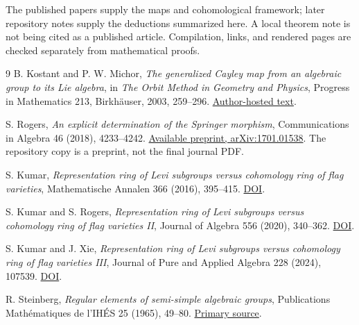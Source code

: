 \documentclass[11pt]{article}
\begin{document}
The published papers supply the maps and cohomological framework; later repository notes supply the deductions summarized here. A local theorem note is not being cited as a published article. Compilation, links, and rendered pages are checked separately from mathematical proofs.

\clearpage
\begin{thebibliography}{9}
B. Kostant and P. W. Michor,
\emph{The generalized Cayley map from an algebraic group to its Lie algebra},
in \emph{The Orbit Method in Geometry and Physics}, Progress in Mathematics 213,
Birkh\"auser, 2003, 259--296.
\href{https://www.mat.univie.ac.at/~michor/kostant.pdf}{Author-hosted text}.

S. Rogers, \emph{An explicit determination of the Springer morphism},
Communications in Algebra 46 (2018), 4233--4242.
\href{https://arxiv.org/abs/1701.01538}{Available preprint, arXiv:1701.01538}.
The repository copy is a preprint, not the final journal PDF.

S. Kumar, \emph{Representation ring of Levi subgroups versus cohomology ring of flag varieties},
Mathematische Annalen 366 (2016), 395--415.
\href{https://doi.org/10.1007/s00208-015-1325-6}{DOI}.

S. Kumar and S. Rogers, \emph{Representation ring of Levi subgroups versus cohomology ring of flag varieties II},
Journal of Algebra 556 (2020), 340--362.
\href{https://doi.org/10.1016/j.jalgebra.2020.02.029}{DOI}.

S. Kumar and J. Xie, \emph{Representation ring of Levi subgroups versus cohomology ring of flag varieties III},
Journal of Pure and Applied Algebra 228 (2024), 107539.
\href{https://doi.org/10.1016/j.jpaa.2023.107539}{DOI}.

R. Steinberg, \emph{Regular elements of semi-simple algebraic groups},
Publications Math\'ematiques de l'IH\'ES 25 (1965), 49--80.
\href{https://www.numdam.org/item/PMIHES_1965__25__49_0/}{Primary source}.
\end{thebibliography}
\end{document}
